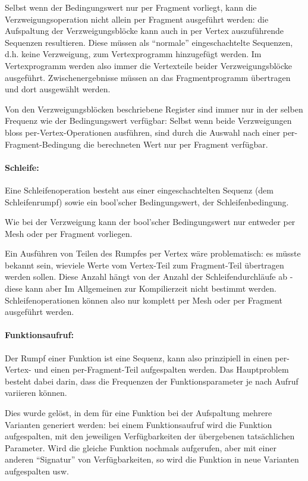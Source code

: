 \documentclass[twoside,a4paper,fleqn,12pt]{article}
\begin{document}
Selbst wenn der Bedingungswert nur per Fragment vorliegt, kann die Verzweigungsoperation nicht allein per Fragment ausgeführt werden:
die Aufspaltung der Verzweigungsblöcke kann auch in per Vertex auszuführende Sequenzen resultieren. Diese müssen als "`normale"'
eingeschachtelte Sequenzen, d.h. keine Verzweigung, zum Vertexprogramm hinzugefügt werden. Im Vertexprogramm werden also immer
die Vertexteile beider Verzweigungsblöcke ausgeführt. Zwischenergebnisse müssen an das Fragmentprogramm übertragen und dort ausgewählt werden.

Von den Verzweigungsblöcken beschriebene Register sind immer nur in der selben Frequenz wie der Bedingungswert verfügbar:
Selbst wenn beide Verzweigungen bloss per-Vertex-Operationen ausführen, sind durch die Auswahl nach einer per-Fragment-Bedingung
die berechneten Wert nur per Fragment verfügbar.

\paragraph{Schleife:} Eine Schleifenoperation besteht aus einer eingeschachtelten Sequenz (dem Schleifenrumpf) sowie
ein bool'scher Bedingungswert, der Schleifenbedingung.

Wie bei der Verzweigung kann der bool'scher Bedingungswert nur entweder per Mesh oder per Fragment vorliegen.

Ein Ausführen von Teilen des Rumpfes per Vertex wäre problematisch: es müsste bekannt sein, wieviele Werte vom Vertex-Teil
zum Fragment-Teil übertragen werden sollen. Diese Anzahl hängt von der Anzahl der Schleifendurchläufe ab -
diese kann aber Im Allgemeinen zur Kompilierzeit nicht bestimmt werden. Schleifenoperationen können also nur komplett
per Mesh oder per Fragment ausgeführt werden.

\paragraph{Funktionsaufruf:} Der Rumpf einer Funktion ist eine Sequenz, kann also prinzipiell in einen per-Vertex- und einen per-Fragment-Teil aufgespalten werden.
Das Hauptproblem besteht dabei darin, dass die Frequenzen der Funktionsparameter je nach Aufruf variieren können.

Dies wurde gelöst, in dem für eine Funktion bei der Aufspaltung mehrere Varianten generiert werden: bei einem Funktionsaufruf
wird die Funktion aufgespalten, mit den jeweiligen Verfügbarkeiten der übergebenen tatsächlichen Parameter. Wird die gleiche Funktion
nochmals aufgerufen, aber mit einer anderen "`Signatur"' von Verfügbarkeiten, so wird die Funktion in neue Varianten aufgespalten usw.
\end{document}
